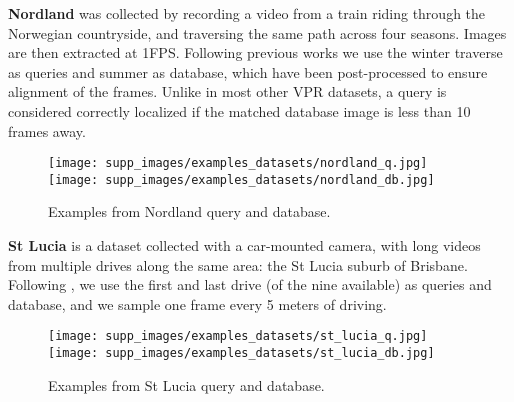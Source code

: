 \documentclass[10pt,twocolumn,letterpaper]{article}
\newcommand{\myparagraph}[1]{\vspace{4pt}\noindent\textbf{#1}}
\begin{document}
\myparagraph{Nordland} \cite{Sunderhauf_2013_nordland} was collected by recording a video from a train riding through the Norwegian countryside, and traversing the same path across four seasons.
Images are then extracted at 1FPS.
Following previous works \cite{Hausler_2019, Hausler_2021_patch_netvlad} we use the winter traverse as queries and summer as database, which have been post-processed to ensure alignment of the frames. Unlike in most other VPR datasets, a query is considered correctly localized if the matched database image is less than 10 frames away.
\vspace{-0.3cm}
\begin{figure}[H]
    \begin{center}
    \texttt{[image: supp\_images/examples\_datasets/nordland\_q.jpg]}
    \texttt{[image: supp\_images/examples\_datasets/nordland\_db.jpg]}
    \end{center}
    \vspace{-0.6cm}
    \caption{Examples from Nordland query and database.}
\end{figure}
\vspace{-0.3cm}

\myparagraph{St Lucia} \cite{Milford_2008_st_lucia}
is a dataset collected with a car-mounted camera, with long videos from multiple drives along the same area: the St Lucia suburb of Brisbane.
Following \cite{Berton_2022_benchmark}, we use the first and last drive (of the nine available) as queries and database, and we sample one frame every 5 meters of driving.
\vspace{-0.3cm}
\begin{figure}[H]
    \begin{center}
    \texttt{[image: supp\_images/examples\_datasets/st\_lucia\_q.jpg]}
    \texttt{[image: supp\_images/examples\_datasets/st\_lucia\_db.jpg]}
    \end{center}
    \vspace{-0.6cm}
    \caption{Examples from St Lucia query and database.}
\end{figure}
\vspace{-0.3cm}
\end{document}
